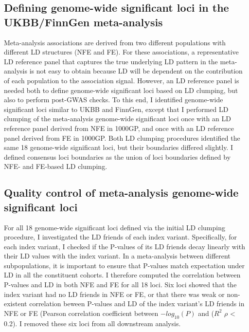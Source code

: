 \subsection{Defining genome-wide significant loci in the UKBB/FinnGen meta-analysis}
Meta-analysis associations are derived from two different populations with different LD structures (NFE and FE). 
For these associations, a  representative LD reference panel that captures the true underlying LD pattern in the meta-analysis is not easy to obtain because LD will be dependent on the contribution of each population to the association signal. However, an LD reference panel is needed both to define genome-wide significant loci based on LD clumping, but also to perform post-GWAS checks. To this end, I identified genome-wide significant loci similar to UKBB and FinnGen, except that I performed LD clumping of the meta-analysis genome-wide significant loci once with an LD reference panel derived from NFE in 1000GP, and once with an LD reference panel derived from FE in 1000GP. Both LD clumping procedures identified the same 18 genome-wide significant loci, but their boundaries differed slightly. I defined consensus loci boundaries as the union of loci boundaries defined by NFE- and FE-based LD clumping. \\

\subsection{Quality control of meta-analysis genome-wide significant loci}
For all 18 genome-wide significant loci defined via the initial LD clumping procedure, I investigated the LD friends of each index variant. Specifically, for each index variant, I checked if the P-values of its LD friends decay linearly with their LD values with the index variant. In a meta-analysis between different subpopulations, it is important to ensure that P-values match expectation under LD  in all the constituent cohorts. I therefore computed the correlation between P-values and LD in both NFE and FE for all 18 loci. Six loci showed that the index variant had no LD friends in NFE or FE, or that there was weak or non-existent correlation beween P-values and LD of the index variant's LD friends in NFE or FE (Pearson correlation coefficient between $-log_{10}(P)$ and ($R^{2}$ $\rho$ < 0.2). I removed these six loci from all downstream analysis.









